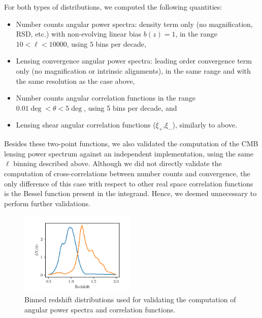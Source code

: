 \documentclass[\docopts]{\docclass}
\begin{document}
For both types of distributions, we computed the following quantities:
\begin{itemize}
\item Number counts angular power spectra: density term only (no magnification, RSD, etc.) with non-evolving linear bias $b(z) = 1$, in the range $10 < \ell < 10000$, using $5$ bins per decade,
\item Lensing convergence angular power spectra: leading order convergence term only (no magnification or intrinsic alignments), in the same range and with the same resolution as the case above,
\item Number counts angular correlation functions in the range $0.01 \deg < \theta < 5 \deg$, using 5 bins per decade, and
\item Lensing shear angular correlation functions ($\xi_+$,$\xi_-$), similarly to above.
\end{itemize}
 Besides these two-point functions, we also validated the computation of the CMB lensing power spectrum against an independent implementation, using the same $\ell$ binning described above. Although we did not directly validate the computation of cross-correlations between number counts and convergence, the only difference of this case with respect to other real space correlation functions is the Bessel function present in the integrand. Hence, we deemed unnecessary to perform further validations. 

\begin{figure}
\centering
\includegraphics[width=0.49\textwidth]{dNdz_codecomp}
\caption{Binned redshift distributions used for validating the computation of angular power spectra and correlation functions.}
\label{fig:zhistos}
\end{figure}
\end{document}
